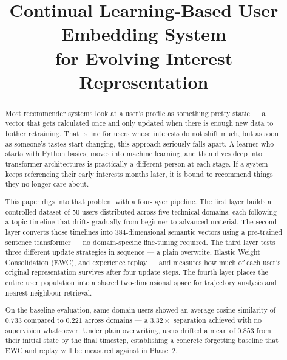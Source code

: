 \documentclass[conference]{IEEEtran}
\begin{document}
\title{%
  Continual Learning-Based User Embedding System\\[3pt]
  for Evolving Interest Representation%
}

\maketitle
\thispagestyle{empty}
\pagestyle{plain}

\begin{abstract}

Most recommender systems look at a user's profile as something
pretty static --- a vector that gets calculated once and only
updated when there is enough new data to bother retraining.
That is fine for users whose interests do not shift much, but
as soon as someone's tastes start changing, this approach
seriously falls apart. A learner who starts with Python basics,
moves into machine learning, and then dives deep into
transformer architectures is practically a different person
at each stage. If a system keeps referencing their early
interests months later, it is bound to recommend things they
no longer care about.

This paper digs into that problem with a four-layer pipeline.
The first layer builds a controlled dataset of 50 users
distributed across five technical domains, each following a
topic timeline that drifts gradually from beginner to advanced
material. The second layer converts those timelines into
384-dimensional semantic vectors using a pre-trained sentence
transformer --- no domain-specific fine-tuning required.
The third layer tests three different update strategies in
sequence --- a plain overwrite, Elastic Weight Consolidation
(EWC), and experience replay --- and measures how much of each
user's original representation survives after four update
steps. The fourth layer places the entire user population into
a shared two-dimensional space for trajectory analysis and
nearest-neighbour retrieval.

On the baseline evaluation, same-domain users showed an
average cosine similarity of $0.733$ compared to $0.221$
across domains --- a $3.32\times$ separation achieved with
no supervision whatsoever. Under plain overwriting, users
drifted a mean of $0.853$ from their initial state by the
final timestep, establishing a concrete forgetting baseline
that EWC and replay will be measured against in Phase~2.

\end{abstract}
\end{document}
